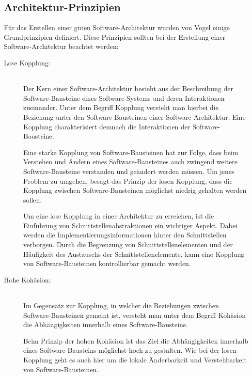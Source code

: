 \subsection{Architektur-Prinzipien\label{subsec2.2.1:Unterunterpunkt-1}}

Für das Erstellen einer guten Software-Architektur wurden von Vogel \cite[S. 128-147]{Vogel.2009} einige Grundprinzipien definiert. Diese Prinzipien sollten bei der Erstellung einer Software-Architektur beachtet werden: \cite[S. 128-147]{Vogel.2009}

\begin{description}
    \item[Lose Kopplung:]\hfill \\
    Der Kern einer Software-Architektur besteht aus der Beschreibung der Software-Bausteine eines Software-Systems und deren Interaktionen zueinander. Unter dem Begriff Kopplung versteht man hierbei die Beziehung unter den Software-Bausteinen einer Software-Architektur. Eine Kopplung charakterisiert demnach die Interaktionen der Software-Bausteine.

    Eine starke Kopplung von Software-Bausteinen hat zur Folge, dass beim Verstehen und Ändern eines Software-Bausteines auch zwingend weitere Software-Bausteine verstanden und geändert werden müssen. Um jenes Problem zu umgehen, besagt das Prinzip der losen Kopplung, dass die Kopplung zwischen Software-Bausteinen möglichst niedrig gehalten werden sollen.

    Um eine lose Kopplung in einer Architektur zu erreichen, ist die Einführung von Schnittstellenabstraktionen ein wichtiger Aspekt. Dabei werden die Implementierungsinformationen hinter den Schnittstellen verborgen. Durch die Begrenzung von Schnittstellenelementen und der Häufigkeit des Austauschs der Schnittstellenelemente, kann eine Kopplung von Software-Bausteinen kontrollierbar gemacht werden.

    \item[Hohe Kohäsion:]\hfill \\
    Im Gegensatz zur Kopplung, in welcher die Beziehungen zwischen Software-Bausteinen gemeint ist, versteht man unter dem Begriff Kohäsion die Abhängigkeiten innerhalb eines Software-Bausteins.

    Beim Prinzip der hohen Kohäsion ist das Ziel die Abhängigkeiten innerhalb eines Software-Bausteins möglichst hoch zu gestalten. Wie bei der losen Kopplung geht es auch hier um die lokale Änderbarkeit und Verstehbarkeit von Software-Bausteinen.
    

\end{description}
